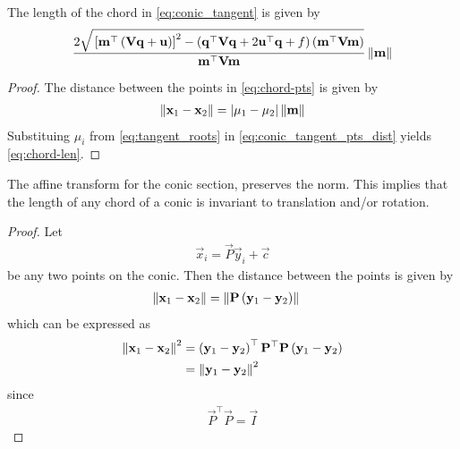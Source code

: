 	\begin{theorem}
		The length of the chord in 
\eqref{eq:conic_tangent}
is given by 
\begin{align}
 \frac{2\sqrt{
{}\left[
\mathbf{m}^{\top}\left(\mathbf{V}\mathbf{q}+\mathbf{u}\right)
\right]^2
-
\left(
\mathbf{q}^{\top}\mathbf{V}\mathbf{q} + 2\mathbf{u}^{\top}\mathbf{q} +f
\right)
\left(\mathbf{m}^{\top}\mathbf{V}\mathbf{m}\right)
}
}
{
\mathbf{m}^{\top}\mathbf{V}\mathbf{m}
}\left\lVert\mathbf{m}\right\rVert
\label{eq:chord-len}
  \end{align}
	\end{theorem}
\begin{proof}
The distance between the points in 
	\eqref{eq:chord-pts}
is given by 
\begin{align}
	\left\lVert\mathbf{x}_1-\mathbf{x}_2\right\rVert =  \left\vert\mu_1-\mu_2\right\vert \left\lVert\mathbf{m}\right\rVert
\label{eq:conic_tangent_pts_dist}
\end{align}
Substituing $\mu_i$ from 
\eqref{eq:tangent_roots} in
\eqref{eq:conic_tangent_pts_dist}
yields
	\eqref{eq:chord-len}.
\end{proof}
	\begin{theorem}
 The affine transform for the conic section, preserves the norm.  This implies that the length of any chord of a conic
	is invariant to translation and/or rotation.
	\end{theorem}
	\begin{proof}
	Let 
\begin{align}
\vec{x}_i = \vec{P}\vec{y}_i+\vec{c} 
\label{eq:conic_affine_pts}
\end{align}
be any two points on the conic.  Then the distance between the points is given by 
\begin{align}
	\left\lVert\mathbf{x}_1-\mathbf{x}_2 \right\rVert &= \left\lVert\mathbf{P}\left(	\mathbf{y}_1 -\mathbf{y}_2 \right)\right\rVert
\end{align}
which can be expressed as 
\begin{align}
	\left\lVert\mathbf{x}_1-\mathbf{x}_2 \right\rVert^2 &= 		\left(\mathbf{y}_1 -\mathbf{y}_2 \right)^{\top}\mathbf{P}^{\top}\mathbf{P}\left(\mathbf{y}_1 -\mathbf{y}_2 \right)
	\\
	&= 		\left\lVert\mathbf{y}_1 -\mathbf{y}_2 \right\rVert^2
\label{eq:conic_affine_norm_preserve}
\end{align}
since 
\begin{align}
	\vec{P}^{\top}\vec{P} = \vec{I}
\end{align}
	\end{proof}
